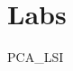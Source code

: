 \documentclass[nociteref]{SIAM-GH-book}
\begin{document}
\part{Labs}
%
%
%
%
%
%
%
{PCA_LSI}
%
%
\end{document}
